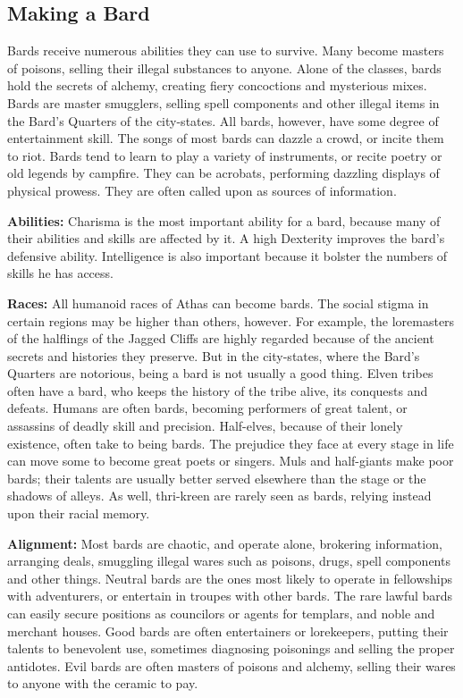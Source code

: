 \subsection{Making a Bard}
Bards receive numerous abilities they can use to survive. Many become masters of poisons, selling their illegal substances to anyone. Alone of the classes, bards hold the secrets of alchemy, creating fiery concoctions and mysterious mixes. Bards are master smugglers, selling spell components and other illegal items in the Bard's Quarters of the city-states. All bards, however, have some degree of entertainment skill. The songs of most bards can dazzle a crowd, or incite them to riot. Bards tend to learn to play a variety of instruments, or recite poetry or old legends by campfire. They can be acrobats, performing dazzling displays of physical prowess. They are often called upon as sources of information.

\textbf{Abilities:} Charisma is the most important ability for a bard, because many of their abilities and skills are affected by it. A high Dexterity improves the bard's defensive ability. Intelligence is also important because it bolster the numbers of skills he has access.

\textbf{Races:} All humanoid races of Athas can become bards. The social stigma in certain regions may be higher than others, however. For example, the loremasters of the halflings of the Jagged Cliffs are highly regarded because of the ancient secrets and histories they preserve. But in the city-states, where the Bard's Quarters are notorious, being a bard is not usually a good thing. Elven tribes often have a bard, who keeps the history of the tribe alive, its conquests and defeats. Humans are often bards, becoming performers of great talent, or assassins of deadly skill and precision. Half-elves, because of their lonely existence, often take to being bards. The prejudice they face at every stage in life can move some to become great poets or singers. Muls and half-giants make poor bards; their talents are usually better served elsewhere than the stage or the shadows of alleys. As well, thri-kreen are rarely seen as bards, relying instead upon their racial memory.

\textbf{Alignment:} Most bards are chaotic, and operate alone, brokering information, arranging deals, smuggling illegal wares such as poisons, drugs, spell components and other things. Neutral bards are the ones most likely to operate in fellowships with adventurers, or entertain in troupes with other bards. The rare lawful bards can easily secure positions as councilors or agents for templars, and noble and merchant houses. Good bards are often entertainers or lorekeepers, putting their talents to benevolent use, sometimes diagnosing poisonings and selling the proper antidotes. Evil bards are often masters of poisons and alchemy, selling their wares to anyone with the ceramic to pay.

